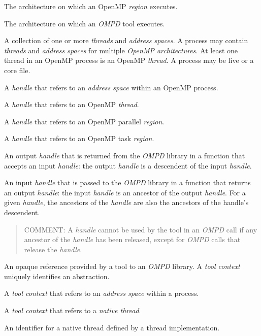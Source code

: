 \glossarydefstart
The architecture on which an OpenMP \emph{region} executes.
\glossarydefend

\glossarydefstart
The architecture on which an \emph{OMPD} tool executes.
\glossarydefend

\glossarydefstart
A collection of one or more \emph{threads} and \emph{address spaces}. 
A process may contain \emph{threads} and \emph{address spaces} for 
multiple \emph{OpenMP architectures}. At least one thread in 
an OpenMP process is an OpenMP \emph{thread}.
A process may be live or a core file.
\glossarydefend

\glossarydefstart
A \emph{handle} that refers to an \emph{address space} within an OpenMP process.
\glossarydefend

\glossarydefstart
A \emph{handle} that refers to an OpenMP \emph{thread}.
\glossarydefend

\glossarydefstart
A \emph{handle} that refers to an OpenMP parallel \emph{region}.
\glossarydefend

\glossarydefstart
A \emph{handle} that refers to an OpenMP task \emph{region}.
\glossarydefend

\glossarydefstart
An output \emph{handle} that is returned from the \emph{OMPD} library 
in a function that accepts an input \emph{handle}: the output \emph{handle} 
is a descendent of the input \emph{handle}.
\glossarydefend

\glossarydefstart
An input \emph{handle} that is passed to the \emph{OMPD} library in a 
function that returns an output \emph{handle}: the input \emph{handle}
is an ancestor of the output \emph{handle}. For a given \emph{handle},
the ancestors of the \emph{handle} are also the ancestors of the handle's 
descendent.

\begin{quote}
	COMMENT: A \emph{handle} cannot be used by the tool in an \emph{OMPD}
        call if any ancestor of the \emph{handle} has been released, except 
        for \emph{OMPD} calls 	that release the \emph{handle}.
\end{quote}
\glossarydefend

\glossarydefstart
An opaque reference provided by a tool to an \emph{OMPD} library. 
A \emph{tool context} uniquely identifies an abstraction.
\glossarydefend

\glossarydefstart
A \emph{tool context} that refers to an \emph{address space} within a process.
\glossarydefend

\glossarydefstart
A \emph{tool context} that refers to a \emph{native thread}.
\glossarydefend

\glossarydefstart
An identifier for a native thread defined by a thread implementation.
\glossarydefend


